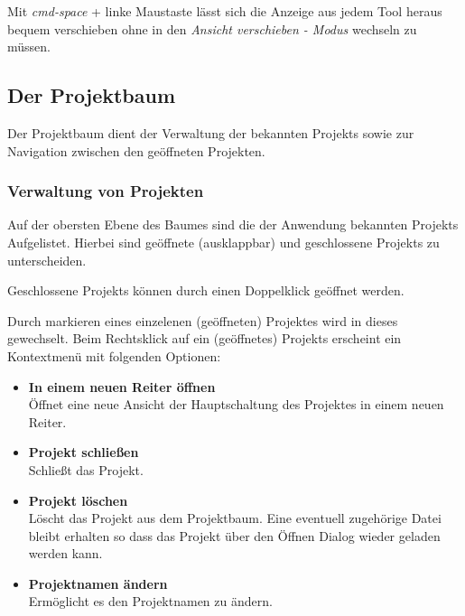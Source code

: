 \documentclass[12pt,a4paper]{scrartcl}
\newcommand{\fckOpenDialog}{Öffnen Dialog\xspace}
\begin{document}
\begin{info}
	Mit \textit{\gls{cmd-space}} + linke Maustaste lässt sich die Anzeige aus jedem Tool heraus bequem verschieben ohne in den \textit{Ansicht verschieben - Modus} wechseln zu müssen.
\end{info}


\subsection{Der Projektbaum}
Der Projektbaum dient der Verwaltung der bekannten \glspl{Projekt} sowie zur Navigation zwischen den geöffneten Projekten. 

\subsubsection{Verwaltung von Projekten}
  Auf der obersten Ebene des Baumes sind die der Anwendung bekannten \glspl{Projekt} Aufgelistet. Hierbei sind geöffnete (ausklappbar) und geschlossene \glspl{Projekt} zu unterscheiden. 

  \begin{info}
        Geschlossene \glspl{Projekt} können durch einen Doppelklick geöffnet werden.
  \end{info}

  Durch markieren eines einzelenen (geöffneten) \gls{Projekt}es wird in dieses gewechselt. Beim Rechtsklick auf ein (geöffnetes) \glspl{Projekt} erscheint ein Kontextmenü mit folgenden Optionen:
  \begin{itemize}
  \item \textbf{In einem neuen Reiter öffnen} \\
      Öffnet eine neue Ansicht der Hauptschaltung des Projektes in einem neuen Reiter.  
  \item \textbf{Projekt schließen} \\
      Schließt das Projekt.
  \item \textbf{Projekt löschen} \\
      Löscht das Projekt aus dem Projektbaum. Eine eventuell zugehörige Datei bleibt erhalten so dass das Projekt über den \fckOpenDialog wieder geladen werden kann.
  \item \textbf{Projektnamen ändern} \\
      Ermöglicht es den Projektnamen zu ändern.
  \end{itemize}
\end{document}
